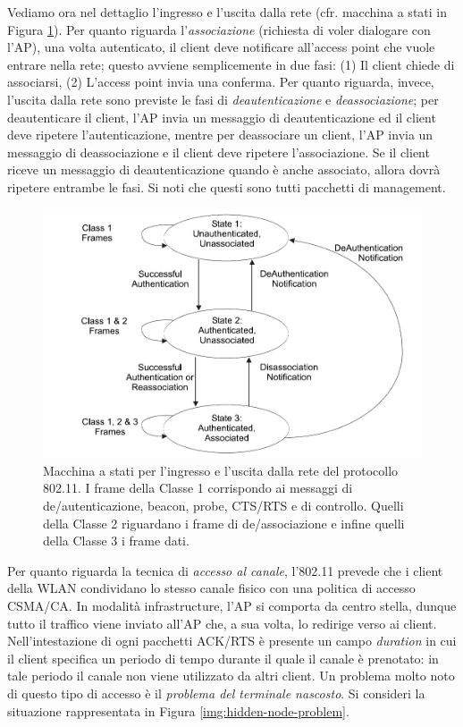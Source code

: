 Vediamo ora nel dettaglio l'ingresso e l'uscita dalla rete (cfr. macchina a stati in Figura \ref{img:802_11-state-machine}). Per quanto riguarda l'\textit{associazione} (richiesta di voler dialogare con l'AP), una volta autenticato, il client deve notificare all'access point che vuole entrare nella rete; questo avviene semplicemente in due fasi: (1) Il client chiede di associarsi, (2) L'access point invia una conferma. Per quanto riguarda, invece, l'uscita dalla rete sono previste le fasi di \textit{deautenticazione} e \textit{deassociazione}; per deautenticare il client, l'AP invia un messaggio di deautenticazione ed il client deve ripetere l'autenticazione, mentre per deassociare un client, l'AP invia un messaggio di deassociazione e il client deve ripetere l'associazione. Se il client riceve un messaggio di deautenticazione quando è anche associato, allora dovrà ripetere entrambe le fasi. Si noti che questi sono tutti pacchetti di management.
\begin{figure}[h]
	\centering
	\includegraphics[scale = 0.3]{images/802_11-state-machine}
	\caption{Macchina a stati per l'ingresso e l'uscita dalla rete del protocollo 802.11. I frame della Classe 1 corrispondo ai messaggi di de/autenticazione, beacon, probe, CTS/RTS e di controllo. Quelli della Classe 2 riguardano i frame di de/associazione e infine quelli della Classe 3 i frame dati. }
	\label{img:802_11-state-machine}
\end{figure}
Per quanto riguarda la tecnica di \textit{accesso al canale}, l'802.11 prevede che i client della WLAN condividano lo stesso canale fisico con una politica di accesso CSMA/CA. In modalità infrastructure, l'AP si comporta da centro stella, dunque tutto il traffico viene inviato all'AP che, a sua volta, lo redirige verso ai client. Nell'intestazione di ogni pacchetti ACK/RTS è presente un campo \textit{duration} in cui il client specifica un periodo di tempo durante il quale il canale è prenotato: in tale periodo il canale non viene utilizzato da altri client. Un problema molto noto di questo tipo di accesso è il \textit{problema del terminale nascosto}. Si consideri la situazione rappresentata in Figura \ref{img:hidden-node-problem}.
